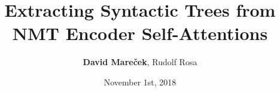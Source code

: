 \documentclass{beamer}
\begin{document}
\title{Extracting Syntactic Trees from NMT Encoder Self-Attentions}
\author[D. Mare\v{c}ek, R. Rosa]{\textbf{David Mare\v{c}ek}, Rudolf Rosa}
\date{November 1st, 2018} 

\begin{frame}[plain]
  \titlepage
\end{frame}

%
%
\end{document}
